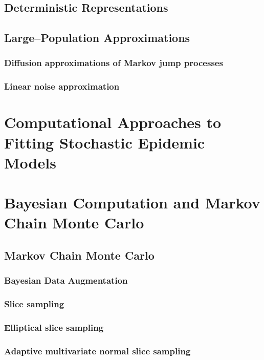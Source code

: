 \subsection{Deterministic Representations}
\label{subsec:deterministic_models}


\subsection{Large--Population Approximations}
\label{subsec:large_pop_approx}

\subsubsection{Diffusion approximations of Markov jump processes}
\label{subsubsec:diff_approx}

\subsubsection{Linear noise approximation}
\label{subsubsec:lna_background}

\section{Computational Approaches to Fitting Stochastic Epidemic Models}
\label{sec:computational_background}

\section{Bayesian Computation and Markov Chain Monte Carlo}
\label{sec:bayesian_computation}

\subsection{Markov Chain Monte Carlo}
\label{subsec:mcmc}

\subsubsection{Bayesian Data Augmentation}
\label{subsec:data_augmentation}

\subsubsection{Slice sampling}
\label{subsubsec:slice_sampling}

\subsubsection{Elliptical slice sampling}
\label{subsubsec:elliptical_slice_sampling}

\subsubsection{Adaptive multivariate normal slice sampling}
\label{subsubsec:mvn_slice_sampling}
